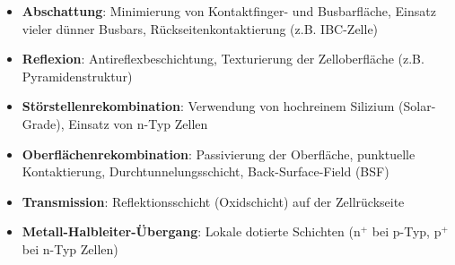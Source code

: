 \begin{itemize}
  \item \textbf{Abschattung}: Minimierung von Kontaktfinger- und Busbarfläche, Einsatz vieler dünner Busbars, Rückseitenkontaktierung (z.B. IBC-Zelle)
  \item \textbf{Reflexion}: Antireflexbeschichtung, Texturierung der Zelloberfläche (z.B. Pyramidenstruktur)
  \item \textbf{Störstellenrekombination}: Verwendung von hochreinem Silizium (Solar-Grade), Einsatz von n-Typ Zellen
  \item \textbf{Oberflächenrekombination}: Passivierung der Oberfläche, punktuelle Kontaktierung, Durchtunnelungsschicht, Back-Surface-Field (BSF)
  \item \textbf{Transmission}: Reflektionsschicht (Oxidschicht) auf der Zellrückseite
  \item \textbf{Metall-Halbleiter-Übergang}: Lokale dotierte Schichten ($\mathrm{n^+}$ bei p-Typ, $\mathrm{p^+}$ bei n-Typ Zellen)
\end{itemize}



